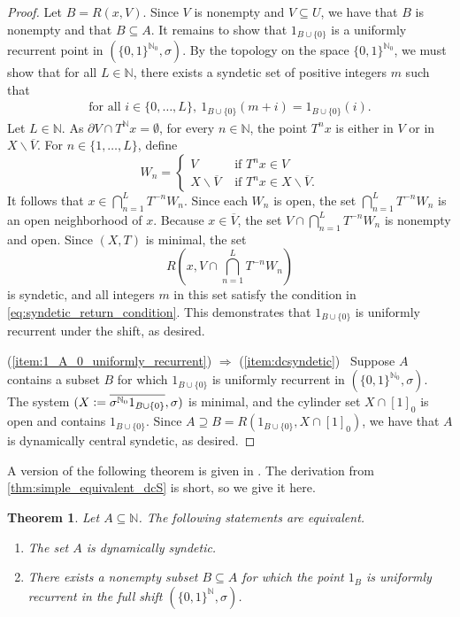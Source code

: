 \documentclass[letter,11pt]{article}
\theoremstyle{plain}
\newtheorem{theorem}{Theorem}
\theoremstyle{definition}
\theoremstyle{plain}
\theoremstyle{plain}
\numberwithin{equation}{section}
\newcommand{\N}{\mathbb{N}}
\newcommand{\defeq}{\vcentcolon=}
\renewcommand{\setminus}{\backslash}
\begin{document}
\begin{proof}
    Let $B = R(x, V)$. Since $V$ is nonempty and $V \subseteq U$, we have that $B$ is nonempty and that $B \subseteq A$. It remains to show that $1_{B \cup \{0\}}$ is a uniformly recurrent point in $(\{0, 1\}^{\N_0}, \sigma)$.  By the topology on the space $\{0, 1\}^{\N_0}$, we must show that for all $L \in \N$, there exists a syndetic set of positive integers $m$ such that
    \begin{align}
    \label{eq:syndetic_return_condition}
        \text{for all $i \in \{0, \ldots, L\}$}, \ 1_{B \cup \{0\}}(m+i) = 1_{B \cup \{0\}}(i).
    \end{align}
    Let $L \in \N$.  As $\partial V \cap T^{\N} x = \emptyset$, for every $n \in \N$, the point $T^n x$ is either in $V$ or in $X \setminus \overline{V}$.
    For $n \in \{1, \ldots, L\}$, define
    \[
        W_n = \begin{cases} V & \text{ if } T^n x \in V \\ X \setminus \overline{V} & \text{ if } T^n x \in X \setminus \overline{V}. \end{cases}
    \]
    It follows that $x \in \bigcap_{n = 1}^L T^{-n} W_n$. Since each $W_n$ is open, the set $\bigcap_{n = 1}^L T^{-n} W_n$ is an open neighborhood of $x$. Because $x \in \overline{V}$, the set $V \cap \bigcap_{n = 1}^L T^{-n} W_n$ is nonempty and open. Since $(X, T)$ is minimal, the set
    \[R \left( x, V \cap \bigcap_{n = 1}^L T^{-n} W_n \right)\]
    is syndetic, and all integers $m$ in this set satisfy the condition in \eqref{eq:syndetic_return_condition}. This demonstrates that $1_{B \cup \{0\}}$ is uniformly recurrent under the shift, as desired.
    
    (\ref{item:1_A_0_uniformly_recurrent}) $\Rightarrow$ (\ref{item:dcsyndetic}) \ Suppose $A$ contains a subset $B$ for which $1_{B \cup \{0\}}$ is uniformly recurrent in $(\{0, 1\}^{\N_0}, \sigma)$. 
    The system $(X \defeq \overline{\sigma^{\N_0} 1_{B \cup \{0\}}}, \sigma)$ is minimal, and the cylinder set $X \cap [1]_0$ is open and contains $1_{B \cup \{0\}}$.  Since $A \supseteq B = R(1_{B \cup \{0\}}, X \cap [1]_0)$, we have that $A$ is dynamically central syndetic, as desired.
\end{proof}

A version of the following theorem is given in \cite[Prop. 2.3]{huang_ye_2005}.  The derivation from \cref{thm:simple_equivalent_dcS} is short, so we give it here.

\begin{theorem}
\label{thm:simple_equivalent_dS}
    Let $A \subseteq \N$.  The following statements are equivalent.
    \begin{enumerate}
        \item \label{item:dsyndetic_one} The set $A$ is dynamically syndetic.
        
        \item \label{item:1_A_uniform_recurrent_one} There exists a nonempty subset $B \subseteq A$ for which the point $1_B$ is uniformly recurrent in the full shift $(\{0, 1\}^{\N},\sigma)$.
    \end{enumerate}
\end{theorem}
\end{document}
